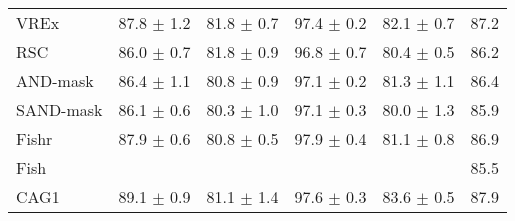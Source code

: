 \documentclass{article}
\begin{document}
\begin{center}
{\begin{tabular}{lccccc}
VREx                 & 87.8 $\pm$ 1.2       & 81.8 $\pm$ 0.7       & 97.4 $\pm$ 0.2       & 82.1 $\pm$ 0.7       & 87.2                 \\
RSC                  & 86.0 $\pm$ 0.7       & 81.8 $\pm$ 0.9       & 96.8 $\pm$ 0.7       & 80.4 $\pm$ 0.5       & 86.2                 \\
AND-mask             & 86.4 $\pm$ 1.1       & 80.8 $\pm$ 0.9       & 97.1 $\pm$ 0.2       & 81.3 $\pm$ 1.1       & 86.4                 \\
SAND-mask            & 86.1 $\pm$ 0.6       & 80.3 $\pm$ 1.0       & 97.1 $\pm$ 0.3       & 80.0 $\pm$ 1.3       & 85.9                 \\
Fishr                & 87.9 $\pm$ 0.6       & 80.8 $\pm$ 0.5       & 97.9 $\pm$ 0.4       & 81.1 $\pm$ 0.8       & 86.9                 \\
Fish                 &                      &                      &                      &                      & 85.5                 \\
\midrule
CAG1                 & 89.1 $\pm$ 0.9       & 81.1 $\pm$ 1.4       & 97.6 $\pm$ 0.3       & 83.6 $\pm$ 0.5       & 87.9                 \\

\bottomrule
\end{tabular}}
\end{center}
    
\end{document}
